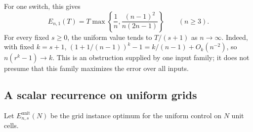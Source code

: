 For one switch, this gives
\begin{equation}\label{eq:uniform-one-switch}
 E_{n,1}(T)=T\max\left\{\frac1n,
 \frac{(n-1)^2}{n(2n-1)}\right\}\qquad(n\ge3).
\end{equation}
For every fixed $s\ge0$, the uniform value tends to $T/(s+1)$ as
$n\to\infty$. Indeed, with fixed $k=s+1$,
$(1+1/(n-1))^k-1=k/(n-1)+O_k(n^{-2})$, so
$n(r^k-1)\to k$. This is an obstruction supplied by one input family;
it does not presume that this family maximizes the error over all inputs.

\subsection{A scalar recurrence on uniform grids}

Let $E^{\mathrm{unit}}_{n,s}(N)$ be the grid instance optimum for the uniform
control on $N$ unit cells.

